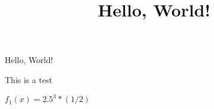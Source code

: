 \documentclass{article}
\title{Hello, World!}
\begin{document}
Hello, World!


This is a test



$f_1(x) = 2.5^3 * (1/2)$
\end{document}
